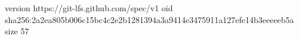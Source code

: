 version https://git-lfs.github.com/spec/v1
oid sha256:2a2ea805b006c15bc4c2e2b1281394a3a9414e3475911a127efe14b3eeeeeb5a
size 57
